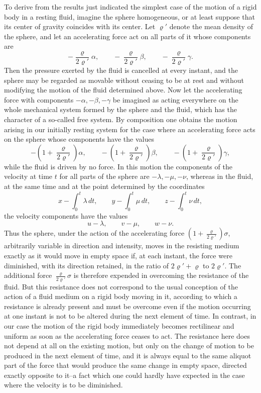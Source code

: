 \documentclass[11pt]{article}
\begin{document}
To derive from the results just indicated the simplest case of the motion of a rigid body in a resting fluid, imagine the sphere homogeneous, or at least suppose that its center of gravity coincides with its center. Let $\varrho'$ denote the mean density of the sphere, and let an accelerating force act on all parts of it whose components are
\[
 -\frac{\varrho}{2\varrho'}\alpha,
 \qquad -\frac{\varrho}{2\varrho'}\beta,
 \qquad -\frac{\varrho}{2\varrho'}\gamma.
\]
Then the pressure exerted by the fluid is cancelled at every instant, and the sphere may be regarded as movable without ceasing to be at rest and without modifying the motion of the fluid determined above. Now let the accelerating force with components $-\alpha,-\beta,-\gamma$ be imagined as acting everywhere on the whole mechanical system formed by the sphere and the fluid, which has the character of a so-called free system. By composition one obtains the motion arising in our initially resting system for the case where an accelerating force acts on the sphere whose components have the values
\[
 -\left(1+\frac{\varrho}{2\varrho'}\right)\alpha,
\qquad
 -\left(1+\frac{\varrho}{2\varrho'}\right)\beta,
\qquad
 -\left(1+\frac{\varrho}{2\varrho'}\right)\gamma,
\]
while the fluid is driven by no force. In this motion the components of the velocity at time $t$ for all parts of the sphere are $-\lambda,-\mu,-\nu$, whereas in the fluid, at the same time and at the point determined by the coordinates
\[
 x-\int_0^t\lambda\,dt,
 \qquad y-\int_0^t\mu\,dt,
 \qquad z-\int_0^t\nu\,dt,
\]
the velocity components have the values
\[
 u-\lambda,
 \qquad v-\mu,
 \qquad w-\nu.
\]
Thus the sphere, under the action of the accelerating force $\left(1+\frac{\varrho}{2\varrho'}\right)\sigma$, arbitrarily variable in direction and intensity, moves in the resisting medium exactly as it would move in empty space if, at each instant, the force were diminished, with its direction retained, in the ratio of $2\varrho'+\varrho$ to $2\varrho'$. The additional force $\frac{\varrho}{2\varrho'}\sigma$ is therefore expended in overcoming the resistance of the fluid. But this resistance does not correspond to the usual conception of the action of a fluid medium on a rigid body moving in it, according to which a resistance is already present and must be overcome even if the motion occurring at one instant is not to be altered during the next element of time. In contrast, in our case the motion of the rigid body immediately becomes rectilinear and uniform as soon as the accelerating force ceases to act. The resistance here does not depend at all on the existing motion, but only on the change of motion to be produced in the next element of time, and it is always equal to the same aliquot part of the force that would produce the same change in empty space, directed exactly opposite to it--a fact which one could hardly have expected in the case where the velocity is to be diminished.
\end{document}

